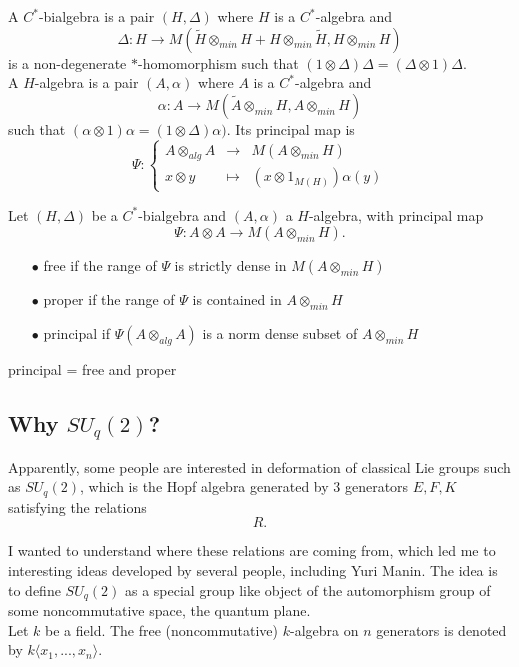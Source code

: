 A $C^*$-bialgebra is a pair $(H,\Delta)$ where $H$ is a $C^*$-algebra and 
\[\Delta: H \rightarrow M(\tilde H \otimes_{min} H + H\otimes_{min} \tilde H, H\otimes_{min} H)\]
is a non-degenerate $*$-homomorphism such that $(1\otimes \Delta) \Delta = (\Delta\otimes 1 ) \Delta$.\\

A $H$-algebra is a pair $(A,\alpha)$ where $A$ is a $C^*$-algebra and 
\[\alpha : A\rightarrow M(\tilde A \otimes_{min} H , A\otimes_{min} H)\]
such that $(\alpha\otimes 1) \alpha = (1 \otimes \Delta )\alpha)$. Its principal map is 
\[\Psi : \left\{ \begin{array}{rcl}
A\otimes_{alg} A & \rightarrow & M(A\otimes_{min} H) \\
x\otimes y & \mapsto & (x \otimes 1_{M(H)})\alpha (y)
\end{array}\right.\]

Let $(H,\Delta)$ be a $C^*$-bialgebra and $(A,\alpha)$ a $H$-algebra, with principal map
\[\Psi: A\otimes A\rightarrow M(A\otimes_{min} H).\]
\begin{itemize}
\item[$\bullet$] free if the range of $\Psi$ is strictly dense in $M(A\otimes_{min} H)$
\item[$\bullet$] proper if the range of $\Psi$ is contained in $A\otimes_{min} H$
\item[$\bullet$] principal if $\Psi(A\otimes_{alg}A )$ is a norm dense subset of $A\otimes_{min} H$
\end{itemize}
principal = free and proper

\subsection{Why $SU_q(2)$?}

Apparently, some people are interested in deformation of classical Lie groups such as $SU_q(2)$, which is the Hopf algebra generated by $3$ generators $E,F,K$ satisfying the relations 
\[R.\]

I wanted to understand where these relations are coming from, which led me to interesting ideas developed by several people, including Yuri Manin. The idea is to define $SU_q(2)$ as a special group like object of the automorphism group of some noncommutative space, the quantum plane.\\

Let $k$ be a field. The free (noncommutative) $k$-algebra on $n$ generators is denoted by $k\langle x_1,... ,x_n\rangle$.

